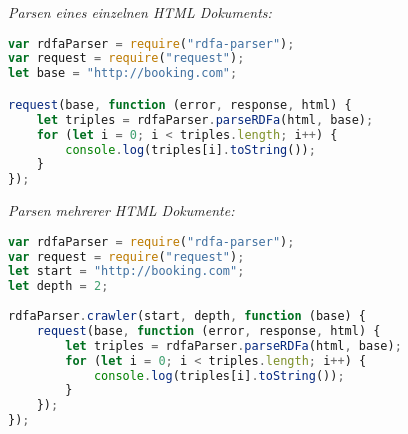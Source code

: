 \documentclass[hidelinks, a4paper, 11pt]{article} %
\begin{document}
\textit{Parsen eines einzelnen HTML Dokuments:}
\begin{lstlisting}[language=JavaScript]
var rdfaParser = require("rdfa-parser");
var request = require("request");
let base = "http://booking.com";

request(base, function (error, response, html) {
    let triples = rdfaParser.parseRDFa(html, base);
    for (let i = 0; i < triples.length; i++) {
        console.log(triples[i].toString());
    }
});
\end{lstlisting}

\textit{Parsen mehrerer HTML Dokumente:}
\begin{lstlisting}[language=JavaScript]
var rdfaParser = require("rdfa-parser");
var request = require("request");
let start = "http://booking.com";
let depth = 2;
 
rdfaParser.crawler(start, depth, function (base) {
    request(base, function (error, response, html) {
        let triples = rdfaParser.parseRDFa(html, base);
        for (let i = 0; i < triples.length; i++) {
            console.log(triples[i].toString());
        }
    });
});
\end{lstlisting}



\renewcommand{\refname}{Referenzen}

\newpage



\end{document}
